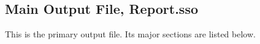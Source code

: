 

\subsection{Main Output File, Report.sso}
This is the primary output file.  Its major sections are listed below.  

